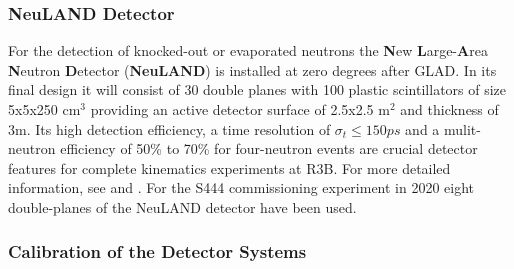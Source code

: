 \subsubsection{NeuLAND Detector}
For the detection of knocked-out or evaporated neutrons the \textbf{N}ew \textbf{L}arge-\textbf{A}rea \textbf{N}eutron \textbf{D}etector (\textbf{NeuLAND}) is installed at zero degrees after GLAD. In its final design it will consist of 30 double planes with 100 plastic scintillators of size 5x5x250 cm$^3$ providing an active detector surface of 2.5x2.5 m$^2$ and thickness of 3m. Its high detection efficiency, a time resolution of $\sigma_t \le 150 ps$ and a mulit-neutron efficiency of 50\% to 70\% for four-neutron events are crucial detector features for complete kinematics experiments at R3B. For more detailed information, see \cite{boretzky2021neuland} and \cite{boretzky2014neuland}.\newline
For the S444 commissioning experiment in 2020 eight double-planes of the NeuLAND detector have been used. 

\subsubsection{Calibration of the Detector Systems}



